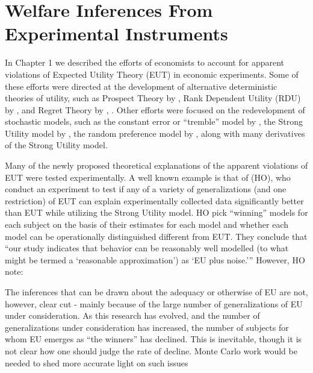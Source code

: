\documentclass[../main.tex]{subfiles}
\begin{document}
\doublespacing
\setcounter{chapter}{3}

\singlespacing
\chapter{Welfare Inferences From Experimental Instruments}
\doublespacing

\lltoc %

In Chapter 1 we described the efforts of economists to account for apparent violations of Expected Utility Theory (EUT) in economic experiments.
Some of these efforts were directed at the development of alternative deterministic theories of utility, such as Prospect Theory by \textcite{Kahneman1979}, Rank Dependent Utility (RDU) by \textcite{Quiggin1982}, and Regret Theory by \textcite{Bell1982}, \textcite{Loomes1982}.
Other efforts were focused on the redevelopment of stochastic models, such as the constant error or \enquote{tremble} model by \textcite{Harless1994}, the Strong Utility model by \textcite{Hey1994}, the random preference model by \textcite{Loomes1995}, along with many derivatives of the Strong Utility model.

Many of the newly proposed theoretical explanations of the apparent violations of EUT were tested experimentally.
A well known example is that of \textcite{Hey1994} (HO), who conduct an experiment to test if any of a variety of generalizations (and one restriction) of EUT can explain experimentally collected data significantly better than EUT while utilizing the Strong Utility model.
HO pick \enquote{winning} models for each subject on the basis of their estimates for each model and whether each model can be operationally distinguished different from EUT.
They conclude that \enquote{our study indicates that behavior can be reasonably well modelled (to what might be termed a \enquote{reasonable approximation}) as \enquote{EU plus noise.}}
However, HO note:

\singlespacing
\begin{displayquote}
The inferences that can be drawn \textelp{} about the adequacy or otherwise of EU are not, however, clear cut - mainly because of the large number of generalizations of EU under consideration.
As this research has evolved, and the number of generalizations under consideration has increased, the number of subjects for whom EU emerges as \enquote{the winners} has declined.
This is inevitable, though it is not clear how one should judge the rate of decline.
\textelp{} Monte Carlo work would be needed to shed more accurate light on such issues
\end{displayquote}
\doublespacing
\end{document}
